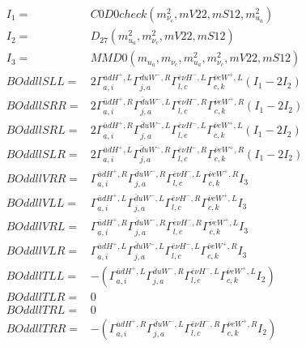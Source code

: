 \documentclass[A4,landscape]{article}
\begin{document}
\begin{align} 
I_1 = & C0D0check(m^2_{\nu_{{c}}}, mV22, mS12, m^2_{u_{{a}}}) \\ 
I_2 = & D_{27}(m^2_{u_{{a}}}, m^2_{\nu_{{c}}}, mV22, mS12) \\ 
I_3 = & MMD0(m_{u_{{a}}}, m_{\nu_{{c}}}, m^2_{u_{{a}}}, m^2_{\nu_{{c}}}, mV22, mS12) \\ 
  BOddllSLL= & 2  \Gamma^{\bar{u}d H^+ ,L}_{a, i} \Gamma^{\bar{d}u W^-,R}_{j, a} \Gamma^{\bar{e}\nu H^-,L}_{l, c} \Gamma^{\bar{\nu}e W^+ ,L}_{c, k} (I_1 - 2 I_2) \\ 
  BOddllSRR= & 2  \Gamma^{\bar{u}d H^+ ,R}_{a, i} \Gamma^{\bar{d}u W^-,L}_{j, a} \Gamma^{\bar{e}\nu H^-,R}_{l, c} \Gamma^{\bar{\nu}e W^+ ,R}_{c, k} (I_1 - 2 I_2) \\ 
  BOddllSRL= & 2  \Gamma^{\bar{u}d H^+ ,R}_{a, i} \Gamma^{\bar{d}u W^-,L}_{j, a} \Gamma^{\bar{e}\nu H^-,L}_{l, c} \Gamma^{\bar{\nu}e W^+ ,L}_{c, k} (I_1 - 2 I_2) \\ 
  BOddllSLR= & 2  \Gamma^{\bar{u}d H^+ ,L}_{a, i} \Gamma^{\bar{d}u W^-,R}_{j, a} \Gamma^{\bar{e}\nu H^-,R}_{l, c} \Gamma^{\bar{\nu}e W^+ ,R}_{c, k} (I_1 - 2 I_2) \\ 
  BOddllVRR= &  \Gamma^{\bar{u}d H^+ ,R}_{a, i} \Gamma^{\bar{d}u W^-,R}_{j, a} \Gamma^{\bar{e}\nu H^-,L}_{l, c} \Gamma^{\bar{\nu}e W^+ ,R}_{c, k} I_3 \\ 
  BOddllVLL= &  \Gamma^{\bar{u}d H^+ ,L}_{a, i} \Gamma^{\bar{d}u W^-,L}_{j, a} \Gamma^{\bar{e}\nu H^-,R}_{l, c} \Gamma^{\bar{\nu}e W^+ ,L}_{c, k} I_3 \\ 
  BOddllVRL= &  \Gamma^{\bar{u}d H^+ ,R}_{a, i} \Gamma^{\bar{d}u W^-,R}_{j, a} \Gamma^{\bar{e}\nu H^-,R}_{l, c} \Gamma^{\bar{\nu}e W^+ ,L}_{c, k} I_3 \\ 
  BOddllVLR= &  \Gamma^{\bar{u}d H^+ ,L}_{a, i} \Gamma^{\bar{d}u W^-,L}_{j, a} \Gamma^{\bar{e}\nu H^-,L}_{l, c} \Gamma^{\bar{\nu}e W^+ ,R}_{c, k} I_3 \\ 
  BOddllTLL= & -( \Gamma^{\bar{u}d H^+ ,L}_{a, i} \Gamma^{\bar{d}u W^-,R}_{j, a} \Gamma^{\bar{e}\nu H^-,L}_{l, c} \Gamma^{\bar{\nu}e W^+ ,L}_{c, k} I_2) \\ 
  BOddllTLR= & 0 \\ 
  BOddllTRL= & 0 \\ 
  BOddllTRR= & -( \Gamma^{\bar{u}d H^+ ,R}_{a, i} \Gamma^{\bar{d}u W^-,L}_{j, a} \Gamma^{\bar{e}\nu H^-,R}_{l, c} \Gamma^{\bar{\nu}e W^+ ,R}_{c, k} I_2) \\ 
\end{align} 
\end{document}
